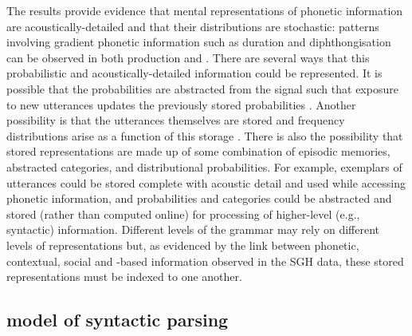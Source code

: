 The results provide evidence that mental representations of phonetic information are acoustically-detailed and that their distributions are stochastic: patterns involving gradient phonetic information such as duration and diphthongisation can be observed in both production and .  There are several ways that this probabilistic and acoustically-detailed information could be represented.  It is possible that the probabilities are abstracted from the signal such that exposure to new utterances updates the previously stored probabilities \citep{norrismcqueen2008}.  Another possibility is that the utterances themselves are stored and frequency distributions arise as a function of this storage \citep{pierrehumbert2001}.  There is also the possibility that stored representations are made up of some combination of episodic memories, abstracted categories, and distributional probabilities.  For example, exemplars of utterances could be stored complete with acoustic detail and used while accessing phonetic information, and probabilities and categories could be abstracted and stored (rather than computed online) for processing of higher-level (e.g., syntactic) information.  Different levels of the grammar may rely on different levels of representations but, as evidenced by the link between phonetic, contextual, social and -based information observed in the SGH data, these stored representations must be indexed to one another.  



\subsection{ model of syntactic parsing}
  
